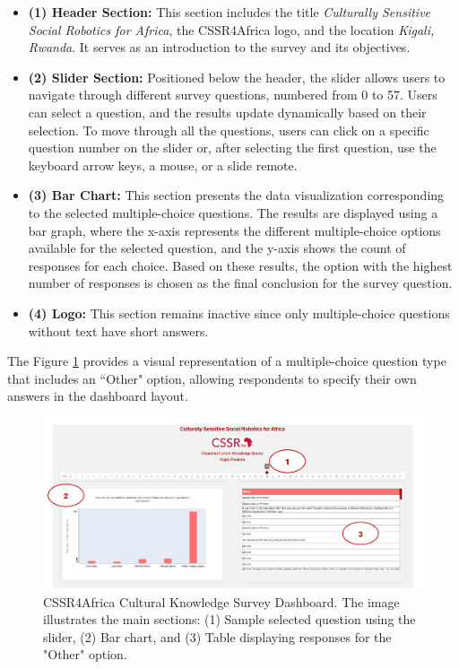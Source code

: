 \documentclass{CSSRforAfrica}
\begin{document}
\begin{itemize}
    \item \textbf{(1) Header Section:} This section includes the title \textit{Culturally Sensitive Social Robotics for Africa}, the CSSR4Africa logo, and the location \textit{Kigali, Rwanda}. It serves as an introduction to the survey and its objectives.
    
    \item \textbf{(2) Slider Section:} Positioned below the header, the slider allows users to navigate through different survey questions, numbered from 0 to 57. Users can select a question, and the results update dynamically based on their selection. To move through all the questions, users can click on a specific question number on the slider or, after selecting the first question, use the keyboard arrow keys, a mouse, or a slide remote.
    
    \item \textbf{(3) Bar Chart:} This section presents the data visualization corresponding to the selected multiple-choice questions. The results are displayed using a bar graph, where the x-axis represents the different multiple-choice options available for the selected question, and the y-axis shows the count of responses for each choice. Based on these results, the option with the highest number of responses is chosen as the final conclusion for the survey question.
    
    \item \textbf{(4) Logo:} This section remains inactive since only multiple-choice questions without text have short answers.
\end{itemize}
The Figure \ref{fig:dashboard4} provides a visual representation of a multiple-choice question type that includes an ``Other" option, allowing respondents to specify their own answers in the dashboard layout.
\begin{figure}[H]
    \centering
    \includegraphics[width=\textwidth]{dashboard44.png} 
    \caption{CSSR4Africa Cultural Knowledge Survey Dashboard. The image illustrates the main sections: (1) Sample selected question using the slider, (2) Bar chart, and (3) Table displaying responses for the "Other" option.}
    \label{fig:dashboard4}
\end{figure}
\end{document}
